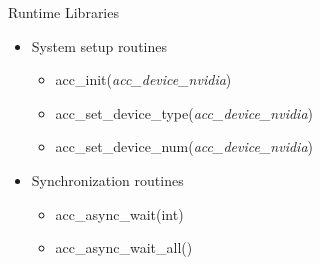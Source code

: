 \documentclass[c,mathserif,compress,xcolor=svgnames]{beamer}
\begin{document}
\begin{frame}{\small Runtime Libraries}
  \begin{itemize}
    \item System setup routines
    \begin{itemize}
      \item acc\_init(\textit{acc\_device\_nvidia})
      \item acc\_set\_device\_type(\textit{acc\_device\_nvidia})
      \item acc\_set\_device\_num(\textit{acc\_device\_nvidia})
    \end{itemize}
    \item Synchronization routines
    \begin{itemize}
      \item acc\_async\_wait(int)
      \item acc\_async\_wait\_all()
    \end{itemize}
  \end{itemize}
\end{frame}

\end{document}
